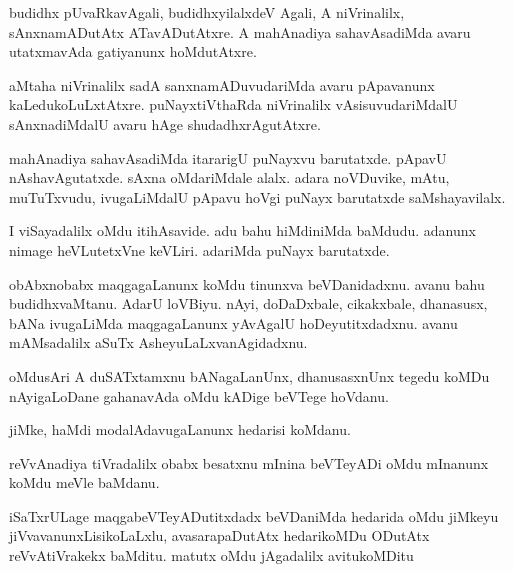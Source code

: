 \documentclass{article}
\begin{document}
\begin{mn}
budidhx pUvaRkavAgali, budidhxyilalxdeV Agali, A niVrinalilx, sAnxnamADutAtx 
ATavADutAtxre.  A mahAnadiya sahavAsadiMda avaru utatxmavAda gatiyanunx hoMdutAtxre.
\end{mn}

\begin{mn}
aMtaha niVrinalilx sadA sanxnamADuvudariMda avaru pApavanunx kaLedukoLuLxtAtxre.  
puNayxtiVthaRda niVrinalilx vAsisuvudariMdalU sAnxnadiMdalU avaru hAge shudadhxrAgutAtxre.
\end{mn}

\begin{mn}
mahAnadiya sahavAsadiMda itararigU puNayxvu barutatxde. pApavU nAshavAgutatxde. 
sAxna oMdariMdale alalx. adara noVDuvike, mAtu, muTuTxvudu, ivugaLiMdalU 
pApavu hoVgi puNayx barutatxde saMshayavilalx.
\end{mn}

\begin{mn}
I viSayadalilx oMdu itihAsavide.  adu bahu hiMdiniMda baMdudu. adanunx nimage 
heVLutetxVne keVLiri.  adariMda puNayx barutatxde. 
\end{mn}

\begin{mn}
obAbxnobabx maqgagaLanunx koMdu tinunxva beVDanidadxnu. avanu bahu budidhxvaMtanu.  
AdarU  loVBiyu.  nAyi, doDaDxbale, cikakxbale, dhanasusx, bANa ivugaLiMda 
maqgagaLanunx yAvAgalU hoDeyutitxdadxnu. avanu mAMsadalilx aSuTx AsheyuLaLxvanAgidadxnu. 
\end{mn}

\begin{mn}
oMdusAri A duSATxtamxnu bANagaLanUnx, dhanusasxnUnx tegedu koMDu nAyigaLoDane 
gahanavAda oMdu kADige beVTege hoVdanu. 
\end{mn}

\begin{mn}
jiMke, haMdi modalAdavugaLanunx hedarisi koMdanu. 
\end{mn}

\begin{mn}
reVvAnadiya tiVradalilx obabx besatxnu mInina beVTeyADi oMdu mInanunx koMdu meVle baMdanu.
\end{mn}

\begin{mn}
iSaTxrULage maqgabeVTeyADutitxdadx beVDaniMda hedarida oMdu jiMkeyu jiVvavanunxLisikoLaLxlu, 
avasarapaDutAtx hedarikoMDu ODutAtx reVvAtiVrakekx baMditu.  matutx oMdu jAgadalilx avitukoMDitu
\end{mn}
\end{document}
